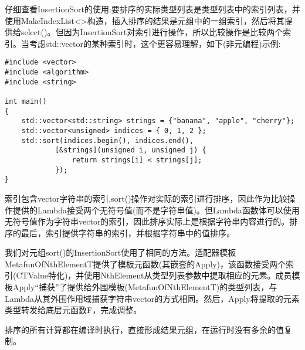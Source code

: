 仔细查看InsertionSort的使用:要排序的实际类型列表是类型列表中的索引列表，并使用MakeIndexList<>构造，插入排序的结果是元组中的一组索引，然后将其提供给select()。但因为InsertionSort对索引进行操作，所以比较操作是比较两个索引。当考虑std::vector的某种索引时，这个更容易理解，如下(非元编程)示例:

\begin{lstlisting}[style=styleCXX]
#include <vector>
#include <algorithm>
#include <string>

int main()
{
	std::vector<std::string> strings = {"banana", "apple", "cherry"};
	std::vector<unsigned> indices = { 0, 1, 2 };
	std::sort(indices.begin(), indices.end(),
			[&strings](unsigned i, unsigned j) {
				return strings[i] < strings[j];
			});
}
\end{lstlisting}

索引包含vector字符串的索引,sort()操作对实际的索引进行排序，因此作为比较操作提供的Lambda接受两个无符号值(而不是字符串值)。但Lambda函数体可以使用无符号值作为字符串vector的索引，因此排序实际上是根据字符串内容进行的。排序的最后，索引提供字符串的索引，并根据字符串中的值排序。

我们对元组sort()的InsertionSort使用了相同的方法。适配器模板MetafunOfNthElementT提供了模板元函数(其嵌套的Apply)，该函数接受两个索引(CTValue特化)，并使用NthElement从类型列表参数中提取相应的元素。成员模板Apply“捕获”了提供给外围模板(MetafunOfNthElementT)的类型列表，与Lambda从其外围作用域捕获字符串vector的方式相同。然后，Apply将提取的元素类型转发给底层元函数F，完成调整。

排序的所有计算都在编译时执行，直接形成结果元组，在运行时没有多余的值复制。

















